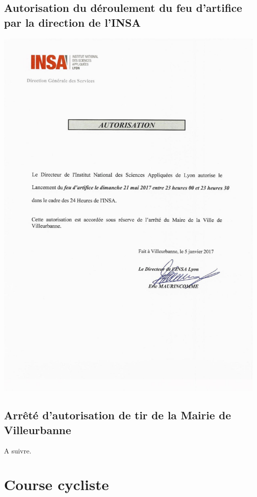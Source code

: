 \documentclass[hidelinks, paper=a4, fontsize=13pt]{report}
\begin{document}
\subsection{Autorisation du déroulement du feu d’artifice par la direction de l’INSA}
\begin{center}
\includegraphics[scale=0.7]{Annexes/Documents/INSAAutorisationFeuArtifice}
\end{center}

\subsection{Arrêté d’autorisation de tir de la Mairie de Villeurbanne}
A suivre.


\newpage
\section{Course cycliste}
\end{document}
